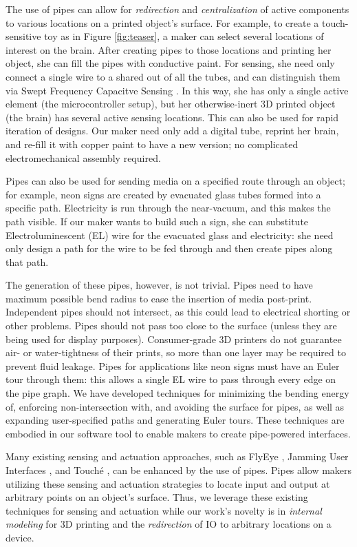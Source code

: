 The use of pipes can allow for \emph{redirection} and \emph{centralization} of active components to various locations on a printed object's surface.   For example, to create a touch-sensitive toy as in Figure \ref{fig:teaser}, a maker can select several locations of interest on the brain.  After creating pipes to those locations and printing her object, she can fill the pipes with conductive paint.  For sensing, she need only connect a single wire to a shared out of all the tubes, and can distinguish them via Swept Frequency Capacitve Sensing \cite{Sato-touche}.  In this way, she has only a single active element (the microcontroller setup), but her otherwise-inert 3D printed object (the brain) has several active sensing locations.  This can also be used for rapid iteration of designs.  Our maker need only add a digital tube, reprint her brain, and re-fill it with copper paint to have a new version; no complicated electromechanical assembly required.

Pipes can also be used for sending media on a specified route through an object; for example, neon signs are created by evacuated glass tubes formed into a specific path.  Electricity is run through the near-vacuum, and this makes the path visible.  If our maker wants to build such a sign, she can substitute Electroluminescent (EL) wire for the evacuated glass and electricity: she need only design a path for the wire to be fed through and then create pipes along that path.

The generation of these pipes, however, is not trivial.  Pipes need to have maximum possible bend radius to ease the insertion of media post-print.  Independent pipes should not intersect, as this could lead to electrical shorting or other problems.  Pipes should not pass too close to the surface (unless they are being used for display purposes).  Consumer-grade 3D printers do not guarantee air- or water-tightness of their prints, so more than one layer may be required to prevent fluid leakage.  Pipes for applications like neon signs must have an Euler tour through them: this allows a single EL wire to pass through every edge on the pipe graph.  We have developed techniques for minimizing the bending energy of, enforcing non-intersection with, and avoiding the surface for pipes, as well as expanding user-specified paths and generating Euler tours.  These techniques are embodied in our software tool to enable makers to create pipe-powered interfaces.

Many existing sensing and actuation approaches, such as FlyEye \cite{Wimmer-flyeye}, Jamming User Interfaces \cite{Follmer-jamming}, and Touch\'{e} \cite{Sato-touche}, can be enhanced by the use of pipes.  Pipes allow makers utilizing these sensing and actuation strategies to locate input and output at arbitrary points on an object's surface.  Thus, we leverage these existing techniques for sensing and actuation while our work's novelty is in \emph{internal modeling} for 3D printing and the \emph{redirection} of IO to arbitrary locations on a device.

